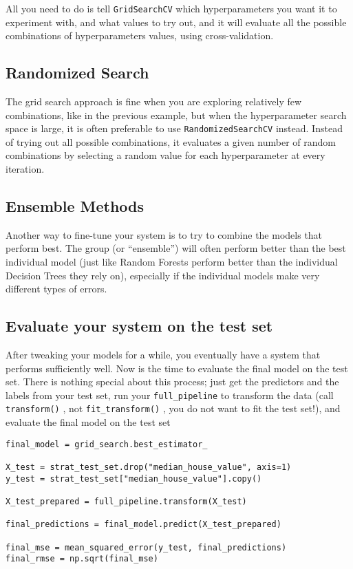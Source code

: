 \documentclass[french]{article}
\begin{document}
All you need to do is tell \lstinline{GridSearchCV} which hyperparameters you want it to experiment with, and what values to try out, and it will evaluate all the possible combinations of hyperparameters values, using cross-validation.

\subsection{Randomized Search}

The grid search approach is fine when you are exploring relatively few combinations, like in the previous example, but when the hyperparameter search space is large, it is often preferable to use \lstinline{RandomizedSearchCV} instead. Instead of trying out all possible combinations, it evaluates a given number of random combinations by selecting a random value for each hyperparameter at every iteration.

\subsection{Ensemble Methods}

Another way to fine-tune your system is to try to combine the models that perform best. The group (or “ensemble”) will often perform better than the best individual model (just like Random Forests perform better than the individual Decision Trees they rely on), especially if the individual models make very different types of errors.


\subsection{Evaluate your system on the test set}
After tweaking your models for a while, you eventually have a system that performs sufficiently well. Now is the time to evaluate the final model on the test set. There is nothing special about this process; just get the predictors and the labels from your test set, run your \lstinline{full_pipeline} to transform the data (call \lstinline{transform()} , not \lstinline{fit_transform()} , you do not want to fit the test set!), and evaluate the final model on the test set

\begin{lstlisting}
final_model = grid_search.best_estimator_

X_test = strat_test_set.drop("median_house_value", axis=1)
y_test = strat_test_set["median_house_value"].copy()

X_test_prepared = full_pipeline.transform(X_test)

final_predictions = final_model.predict(X_test_prepared)

final_mse = mean_squared_error(y_test, final_predictions)
final_rmse = np.sqrt(final_mse)
\end{lstlisting}
\end{document}
